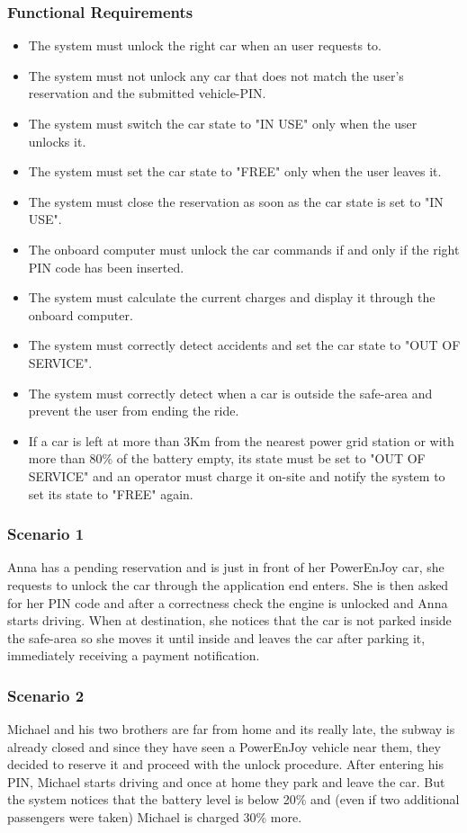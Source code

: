 \subsubsection{Functional Requirements}
\begin{itemize}
  \item The system must unlock the right car when an user requests to.
  \item The system must not unlock any car that does not match the user's reservation and the submitted vehicle-PIN.
  \item The system must switch the car state to "IN USE" only when the user unlocks it.
  \item The system must set the car state to "FREE" only when the user leaves it.
  \item The system must close the reservation as soon as the car state is set to "IN USE".
  \item The onboard computer must unlock the car commands if and only if the right PIN code has been inserted.
  \item The system must calculate the current charges and display it through the onboard computer.
  \item The system must correctly detect accidents and set the car state to "OUT OF SERVICE".
  \item The system must correctly detect when a car is outside the safe-area and prevent the user from ending the ride.
  \item If a car is left at more than 3Km from the nearest power grid station or with more than 80\% of the battery empty, its state must be set to "OUT OF SERVICE" and an operator must charge it on-site and notify the system to set its state to "FREE" again.
\end{itemize}


\subsubsection{Scenario 1}
Anna has a pending reservation and is just in front of her PowerEnJoy car, she requests to unlock the car through the application end enters. She is then asked for her PIN code and after a correctness check the engine is unlocked and Anna starts driving. When at destination, she notices that the car is not parked inside the safe-area so she moves it until inside and leaves the car after parking it, immediately receiving a payment notification.


\subsubsection{Scenario 2}
Michael and his two brothers are far from home and its really late, the subway is already closed and since they have seen a PowerEnJoy vehicle near them, they decided to reserve it and proceed with the unlock procedure. After entering his PIN, Michael starts driving and once at home they park and leave the car. But the system notices that the battery level is below 20\% and (even if two additional passengers were taken) Michael is charged 30\% more.


